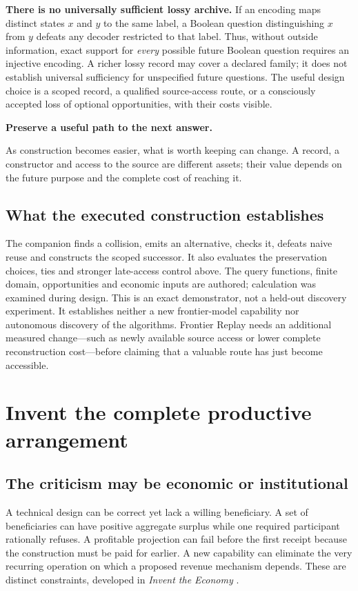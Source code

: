 \textbf{There is no universally sufficient lossy archive.} If an encoding maps distinct states $x$ and $y$ to the same label, a Boolean question distinguishing $x$ from $y$ defeats any decoder restricted to that label. Thus, without outside information, exact support for \emph{every} possible future Boolean question requires an injective encoding. A richer lossy record may cover a declared family; it does not establish universal sufficiency for unspecified future questions. The useful design choice is a scoped record, a qualified source-access route, or a consciously accepted loss of optional opportunities, with their costs visible.

\begin{thesisbox}
\textbf{Preserve a useful path to the next answer.}\par
As construction becomes easier, what is worth keeping can change. A record, a constructor and access to the source are different assets; their value depends on the future purpose and the complete cost of reaching it.
\end{thesisbox}

\subsection{What the executed construction establishes}
The companion finds a collision, emits an alternative, checks it, defeats naive reuse and constructs the scoped successor. It also evaluates the preservation choices, ties and stronger late-access control above. The query functions, finite domain, opportunities and economic inputs are authored; calculation was examined during design. This is an exact demonstrator, not a held-out discovery experiment. It establishes neither a new frontier-model capability nor autonomous discovery of the algorithms. Frontier Replay needs an additional measured change---such as newly available source access or lower complete reconstruction cost---before claiming that a valuable route has just become accessible.

\section{Invent the complete productive arrangement}
\label{sec:economy}
\subsection{The criticism may be economic or institutional}
A technical design can be correct yet lack a willing beneficiary. A set of beneficiaries can have positive aggregate surplus while one required participant rationally refuses. A profitable projection can fail before the first receipt because the construction must be paid for earlier. A new capability can eliminate the very recurring operation on which a proposed revenue mechanism depends. These are distinct constraints, developed in \emph{Invent the Economy} \citep[\S2--9]{boucher_economy}.

